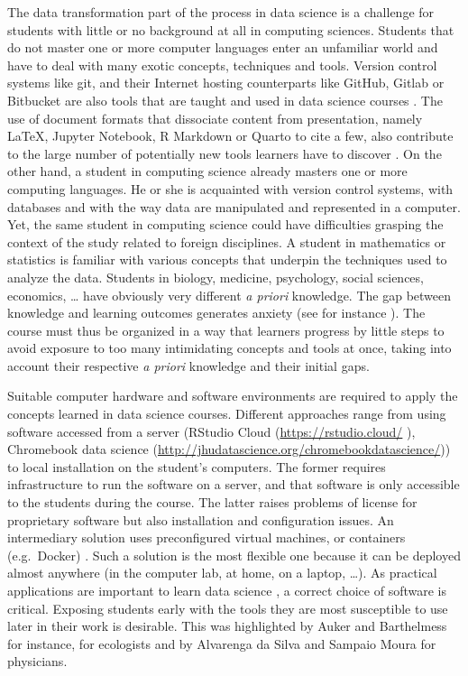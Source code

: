 \documentclass{aims}
\theoremstyle{definition}
\begin{document}
The data transformation part of the process in data science is a
challenge for students with little or no background at all in computing
sciences. Students that do not master one or more computer languages
enter an unfamiliar world and have to deal with many exotic concepts,
techniques and tools. Version control systems like git, and their
Internet hosting counterparts like GitHub, Gitlab or Bitbucket are also
tools that are taught and used in data science courses
\cite{Fiksel2019, Hsing2019}. The use of document formats that
dissociate content from presentation, namely LaTeX, Jupyter Notebook, R
Markdown or Quarto to cite a few, also contribute to the large number of
potentially new tools learners have to discover \cite{Baumer2014}. On
the other hand, a student in computing science already masters one or
more computing languages. He or she is acquainted with version control
systems, with databases and with the way data are manipulated and
represented in a computer. Yet, the same student in computing science
could have difficulties grasping the context of the study related to
foreign disciplines. A student in mathematics or statistics is familiar
with various concepts that underpin the techniques used to analyze the
data. Students in biology, medicine, psychology, social sciences,
economics, \ldots{} have obviously very different \emph{a priori}
knowledge. The gap between knowledge and learning outcomes generates
anxiety (see for instance \cite{Onwuegbuzie2003}). The course must thus
be organized in a way that learners progress by little steps to avoid
exposure to too many intimidating concepts and tools at once, taking
into account their respective \emph{a priori} knowledge and their
initial gaps.

Suitable computer hardware and software environments are required to
apply the concepts learned in data science courses. Different approaches
range from using software accessed from a server \cite{Theobold2021}
(RStudio Cloud (\url{https://rstudio.cloud/} \cite{Rstudio2015}),
Chromebook data science
(\url{http://jhudatascience.org/chromebookdatascience/})) to local
installation on the student's computers. The former requires
infrastructure to run the software on a server, and that software is
only accessible to the students during the course. The latter raises
problems of license for proprietary software but also installation and
configuration issues. An intermediary solution uses preconfigured
virtual machines, or containers (e.g.~Docker)
\cite{Cetinkaya-Rundel2018, Boettiger2015}. Such a solution is the most
flexible one because it can be deployed almost anywhere (in the computer
lab, at home, on a laptop, \ldots). As practical applications are
important to learn data science \cite{Larwin2011}, a correct choice of
software is critical. Exposing students early with the tools they are
most susceptible to use later in their work is desirable. This was
highlighted by Auker and Barthelmess \cite{Auker2020} for instance, for
ecologists and by Alvarenga da Silva and Sampaio Moura
\cite{Alvarenga2020} for physicians.
\end{document}
